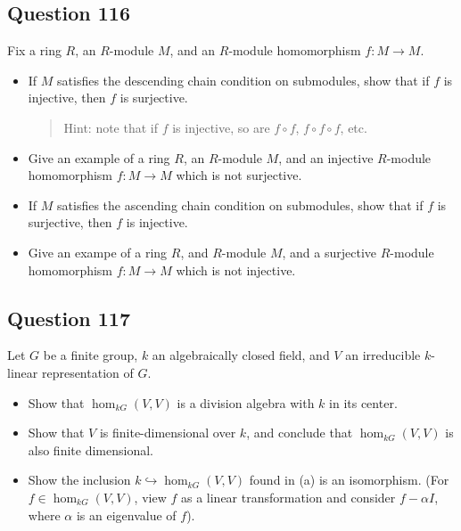 \documentclass[12pt]{article}
\begin{document}
\hypertarget{question-116}{%
\subsection{Question 116}\label{question-116}}

Fix a ring \(R\), an \(R\)-module \(M\), and an \(R\)-module
homomorphism \(f:M\rightarrow M\).

\begin{itemize}
\item
  If \(M\) satisfies the descending chain condition on submodules, show
  that if \(f\) is injective, then \(f\) is surjective.

  \begin{quote}
  Hint: note that if \(f\) is injective, so are \(f\circ f\),
  \(f\circ f\circ f\), etc.
  \end{quote}
\item
  Give an example of a ring \(R\), an \(R\)-module \(M\), and an
  injective \(R\)-module homomorphism \(f:M\rightarrow M\) which is not
  surjective.
\item
  If \(M\) satisfies the ascending chain condition on submodules, show
  that if \(f\) is surjective, then \(f\) is injective.
\item
  Give an exampe of a ring \(R\), and \(R\)-module \(M\), and a
  surjective \(R\)-module homomorphism \(f:M\rightarrow M\) which is not
  injective.
\end{itemize}

\hypertarget{question-117}{%
\subsection{Question 117}\label{question-117}}

Let \(G\) be a finite group, \(k\) an algebraically closed field, and
\(V\) an irreducible \(k\)-linear representation of \(G\).

\begin{itemize}
\item
  Show that \(\hom_{kG}(V,V)\) is a division algebra with \(k\) in its
  center.
\item
  Show that \(V\) is finite-dimensional over \(k\), and conclude that
  \(\hom_{kG}(V,V)\) is also finite dimensional.
\item
  Show the inclusion \(k\hookrightarrow\hom_{kG}(V,V)\) found in (a) is
  an isomorphism. (For \(f\in\hom_{kG}(V,V)\), view \(f\) as a linear
  transformation and consider \(f-\alpha I\), where \(\alpha\) is an
  eigenvalue of \(f\)).
\end{itemize}
\end{document}
